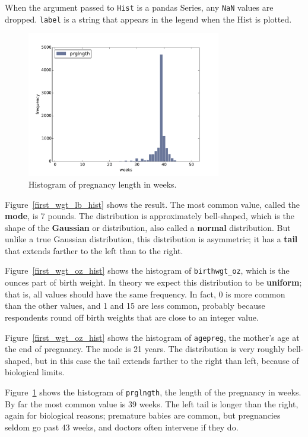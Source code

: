 \documentclass[12pt]{book}
\begin{document}
When the argument passed to {\tt Hist} is a pandas Series, any
{\tt NaN} values are dropped.  {\tt label} is a string that appears
in the legend when the Hist is plotted.

\begin{figure}
\centerline{\includegraphics[height=2.5in]{figs/first_prglngth_hist.pdf}}
\caption{Histogram of pregnancy length in weeks.}
\label{first_prglngth_hist}
\end{figure}

Figure~\ref{first_wgt_lb_hist} shows the result.  The most common
value, called the {\bf mode}, is 7 pounds.  The distribution is
approximately bell-shaped, which is the shape of the {\bf Gaussian} or
distribution, also called a {\bf normal} distribution.  But unlike a
true Gaussian distribution, this distribution is asymmetric; it has
a {\bf tail} that extends farther to the left than to the right.

Figure~\ref{first_wgt_oz_hist} shows the histogram of
\verb"birthwgt_oz", which is the ounces part of birth weight.  In
theory we expect this distribution to be {\bf uniform}; that is, all
values should have the same frequency.  In fact, 0 is more common than
the other values, and 1 and 15 are less common, probably because
respondents round off birth weights that are close to an integer
value.

Figure~\ref{first_wgt_oz_hist} shows the histogram of \verb"agepreg",
the mother's age at the end of pregnancy.  The mode is 21 years.  The
distribution is very roughly bell-shaped, but in this case the tail
extends farther to the right than left, because of biological limits.

Figure~\ref{first_prglngth_hist} shows the histogram of \verb"prglngth",
the length of the pregnancy in weeks.  By far the most common value
is 39 weeks.  The left tail is longer than the right, again for
biological reasons; premature babies are common, but pregnancies seldom
go past 43 weeks, and doctors often intervene if they do. 
\end{document}
